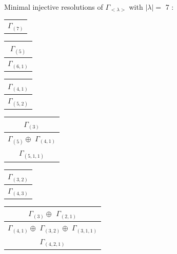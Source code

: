 \documentclass[main.tex]{subfiles}
\begin{document}
\bigskip
Minimal injective resolutions of $\Gamma_{<\lambda>}$ with $|\lambda| = $ 7 : \\
\begin{minipage}{.2\textwidth}
\centering
\begin{tabular}{c}
$\Gamma_{(
7
)}$
\\
\end{tabular}\end{minipage}
\begin{minipage}{.2\textwidth}
\centering
\begin{tabular}{c}
$\Gamma_{(
5
)}$
\\ \hline
$\Gamma_{(
6 , 
1
)}$
\\
\end{tabular}\end{minipage}
\begin{minipage}{.2\textwidth}
\centering
\begin{tabular}{c}
$\Gamma_{(
4 , 
1
)}$
\\ \hline
$\Gamma_{(
5 , 
2
)}$
\\
\end{tabular}\end{minipage}
\begin{minipage}{.2\textwidth}
\centering
\begin{tabular}{c}
$\Gamma_{(
3
)}$
\\ \hline
$\Gamma_{(
5
)} \oplus$
$\Gamma_{(
4 , 
1
)}$
\\ \hline
$\Gamma_{(
5 , 
1 , 
1
)}$
\\
\end{tabular}\end{minipage}
\begin{minipage}{.2\textwidth}
\centering
\begin{tabular}{c}
$\Gamma_{(
3 , 
2
)}$
\\ \hline
$\Gamma_{(
4 , 
3
)}$
\\
\end{tabular}\end{minipage}
\bigskip
\begin{minipage}{.3\textwidth}
\centering
\begin{tabular}{c}
$\Gamma_{(
3
)} \oplus$
$\Gamma_{(
2 , 
1
)}$
\\ \hline
$\Gamma_{(
4 , 
1
)} \oplus$
$\Gamma_{(
3 , 
2
)} \oplus$
$\Gamma_{(
3 , 
1 , 
1
)}$
\\ \hline
$\Gamma_{(
4 , 
2 , 
1
)}$
\\
\end{tabular}\end{minipage}
\end{document}
